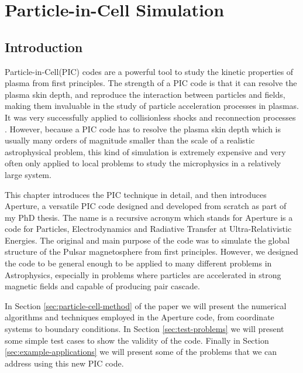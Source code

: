 
\chapter{Particle-in-Cell Simulation}
\label{chap:pic}

\section{Introduction}
\label{sec:introduction}

Particle-in-Cell(PIC) codes are a powerful tool to study the kinetic properties
of plasma from first principles. The strength of a PIC code is that it can
resolve the plasma skin depth, and reproduce the interaction between particles
and fields, making them invaluable in the study of particle acceleration
processes in plasmas. It was very successfully applied to collisionless shocks
and reconnection processes
. However, because a PIC code has to resolve the
plasma skin depth which is usually many orders of magnitude smaller than the
scale of a realistic astrophysical problem, this kind of simulation is extremely
expensive and very often only applied to local problems to study the
microphysics in a relatively large system.

This chapter introduces the PIC technique in detail, and then introduces
Aperture, a versatile PIC code designed and developed from scratch as part of my
PhD thesis. The name is a recursive acronym which stands for Aperture is a code
for Particles, Electrodynamics and Radiative Transfer at Ultra-Relativistic
Energies. The original and main purpose of the code was to simulate the global
structure of the Pulsar magnetosphere from first principles. However, we
designed the code to be general enough to be applied to many different problems
in Astrophysics, especially in problems where particles are accelerated in
strong magnetic fields and capable of producing pair cascade.

In Section \ref{sec:particle-cell-method} of the paper we will present
the numerical algorithms and techniques employed in the Aperture code,
from coordinate systems to boundary conditions. In Section
\ref{sec:test-problems} we will present some simple test cases to show
the validity of the code. Finally in Section
\ref{sec:example-applications} we will present some of the problems
that we can address using this new PIC code.

